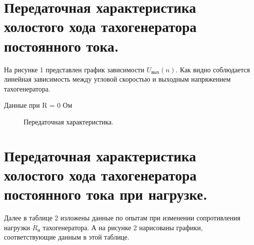 \documentclass[a4paper, 11pt]{article}
\begin{document}


\section*{Передаточная характеристика холостого хода тахогенератора постоянного тока.}
На рисунке 1 представлен график зависимости $U_\text{вых}(n)$. Как видно соблюдается линейная зависимость между угловой скоростью и выходным напряжением тахогенератора.

\begin{minipage}[c]{0.25\textwidth}
\begin{table}[H]
\caption{Данные при R = 0 Ом}
\end{table}
\end{minipage}
\begin{minipage}[c]{0.7\textwidth}
\begin{figure}[H]
    \centering
    \caption{Передаточная характеристика.}
\end{figure}
\end{minipage}


\section*{Передаточная характеристика холостого хода тахогенератора постоянного тока при нагрузке.}

Далее в таблице 2 изложены данные по опытам при изменении сопротивления нагрузки $R_\text{н}$ тахогенератора. А на рисунке 2 нарисованы графики, соответствующие данным в этой таблице.
\end{document}
